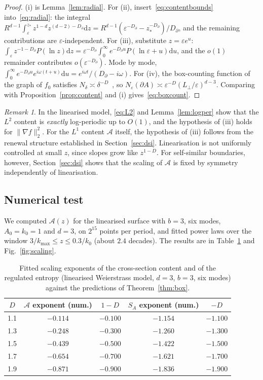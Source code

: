 \documentclass[11pt]{article}
\theoremstyle{definition}\newtheorem{definition}{Definition}[section]
\theoremstyle{remark}\newtheorem*{remark}{Remark}
\newcommand{\cA}{\mathcal{A}}
\newcommand{\dd}{\mathrm{d}}
\begin{document}
\begin{proof}
(i) is Lemma~\ref{lem:radial}. For (ii), insert~\eqref{eq:contentbounds} into~\eqref{eq:radial}: the
integral $R^{d-1}\int_\varepsilon^{z_*}z^{1-d}z^{(d-2)-D_\partial}\dd z=R^{d-1}(\varepsilon^{-D_\partial}-z_*^{-D_\partial})/D_\partial$,
and the remaining contributions are $\varepsilon$-independent. For (iii), substitute $z=\varepsilon e^u$:
$\int_\varepsilon z^{-1-D_\partial}P(\ln z)\dd z=\varepsilon^{-D_\partial}\int_0^\infty e^{-D_\partial u}P(\ln\varepsilon+u)\dd u$, and the
$o(1)$ remainder contributes $o(\varepsilon^{-D_\partial})$. Mode by mode,
$\int_0^\infty e^{-D_\partial u}e^{i\omega(t+u)}\dd u=e^{i\omega t}/(D_\partial-i\omega)$. For (iv), the box-counting
function of the graph of $f_0$ satisfies $N_\delta\asymp\delta^{-D}$~\cite{Falconer}, so
$N_\varepsilon(\partial A)\asymp\varepsilon^{-D}(L_\perp/\varepsilon)^{d-3}$. Comparing with
Proposition~\ref{prop:content} and (i) gives~\eqref{eq:boxcount}.
\end{proof}

\begin{remark}
In the linearised model, \eqref{eq:L2} and Lemma~\ref{lem:logper} show that the $L^2$ content is
\emph{exactly} log-periodic up to $O(1)$, and the hypothesis of (iii) holds for $\|\nabla f\|_2^2$. For the
$L^1$ content $\cA$ itself, the hypothesis of (iii) follows from the renewal structure established in
Section~\ref{sec:dsi}. Linearisation is not uniformly controlled at small $z$, since slopes grow like
$z^{1-D}$. For self-similar boundaries, however, Section~\ref{sec:dsi} shows that the scaling of $\cA$ is
fixed by symmetry independently of linearisation.
\end{remark}

\subsection{Numerical test}
\label{sec:table1}
We computed $\cA(z)$ for the linearised surface with $b=3$, six modes, $A_0=k_0=1$ and $d=3$, on $2^{15}$
points per period, and fitted power laws over the window $3/k_{\max}\le z\le0.3/k_0$ (about $2.4$ decades).
The results are in Table~\ref{tab:exponents} and Fig.~\ref{fig:scaling}.
\begin{table}[htbp]
\centering
\begin{tabular}{ccccc}
\toprule
$D$ & $\cA$ exponent (num.) & $1-D$ & $S_A$ exponent (num.) & $-D$\\
\midrule
1.1 & $-0.114$ & $-0.100$ & $-1.154$ & $-1.100$\\
1.3 & $-0.248$ & $-0.300$ & $-1.260$ & $-1.300$\\
1.5 & $-0.439$ & $-0.500$ & $-1.422$ & $-1.500$\\
1.7 & $-0.654$ & $-0.700$ & $-1.621$ & $-1.700$\\
1.9 & $-0.871$ & $-0.900$ & $-1.836$ & $-1.900$\\
\bottomrule
\end{tabular}
\caption{Fitted scaling exponents of the cross-section content and of the regulated entropy (linearised
Weierstrass model, $d=3$, $b=3$, six modes) against the predictions of Theorem~\ref{thm:box}.}
\label{tab:exponents}
\end{table}
\end{document}
